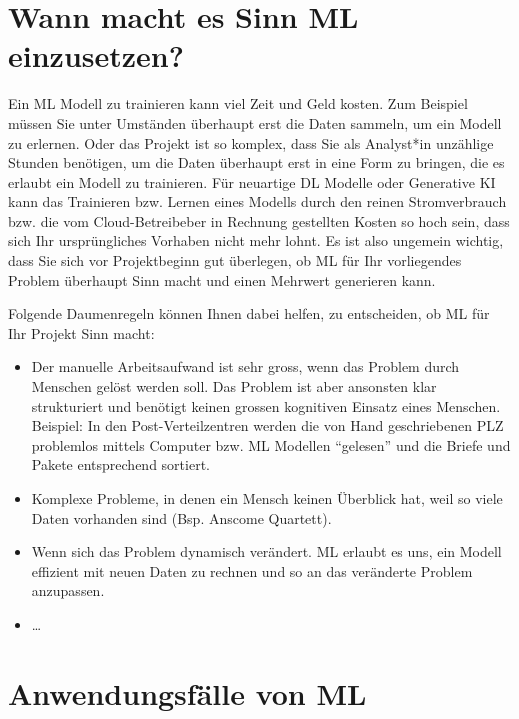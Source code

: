 \documentclass[
]{book}
\providecommand{\tightlist}{%
  \setlength{\itemsep}{0pt}\setlength{\parskip}{0pt}}
\begin{document}
\hypertarget{wann-macht-es-sinn-ml-einzusetzen}{%
\section{Wann macht es Sinn ML einzusetzen?}\label{wann-macht-es-sinn-ml-einzusetzen}}

Ein ML Modell zu trainieren kann viel Zeit und Geld kosten. Zum Beispiel müssen Sie unter Umständen überhaupt erst die Daten sammeln, um ein Modell zu erlernen. Oder das Projekt ist so komplex, dass Sie als Analyst*in unzählige Stunden benötigen, um die Daten überhaupt erst in eine Form zu bringen, die es erlaubt ein Modell zu trainieren. Für neuartige DL Modelle oder Generative KI kann das Trainieren bzw. Lernen eines Modells durch den reinen Stromverbrauch bzw. die vom Cloud-Betreibeber in Rechnung gestellten Kosten so hoch sein, dass sich Ihr ursprüngliches Vorhaben nicht mehr lohnt. Es ist also ungemein wichtig, dass Sie sich vor Projektbeginn gut überlegen, ob ML für Ihr vorliegendes Problem überhaupt Sinn macht und einen Mehrwert generieren kann.

Folgende Daumenregeln können Ihnen dabei helfen, zu entscheiden, ob ML für Ihr Projekt Sinn macht:

\begin{itemize}
\tightlist
\item
  Der manuelle Arbeitsaufwand ist sehr gross, wenn das Problem durch Menschen gelöst werden soll. Das Problem ist aber ansonsten klar strukturiert und benötigt keinen grossen kognitiven Einsatz eines Menschen. Beispiel: In den Post-Verteilzentren werden die von Hand geschriebenen PLZ problemlos mittels Computer bzw. ML Modellen ``gelesen'' und die Briefe und Pakete entsprechend sortiert.
\item
  Komplexe Probleme, in denen ein Mensch keinen Überblick hat, weil so viele Daten vorhanden sind (Bsp. Anscome Quartett).
\item
  Wenn sich das Problem dynamisch verändert. ML erlaubt es uns, ein Modell effizient mit neuen Daten zu rechnen und so an das veränderte Problem anzupassen.
\item
  \ldots{}
\end{itemize}

\hypertarget{anwendungsfuxe4lle-von-ml}{%
\section{Anwendungsfälle von ML}\label{anwendungsfuxe4lle-von-ml}}
\end{document}

